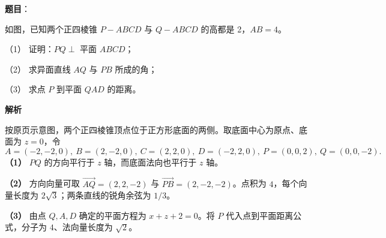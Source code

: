 \begin{answer}

\textbf{题目}：

如图，已知两个正四棱锥 $P-ABCD$ 与 $Q-ABCD$ 的高都是 2，$AB=4$。

（1） 证明：$PQ\perp$ 平面 $ABCD$；

（2） 求异面直线 $AQ$ 与 $PB$ 所成的角；

（3） 求点 $P$ 到平面 $QAD$ 的距离。
\nopagebreak[4]
\begin{center}\end{center}
\nopagebreak[4]
\textbf{解析}

按原页示意图，两个正四棱锥顶点位于正方形底面的两侧。取底面中心为原点、底面为 $z=0$，令
\nopagebreak[4]
\[
A=(-2,-2,0),\ B=(2,-2,0),\ C=(2,2,0),\ D=(-2,2,0),\ P=(0,0,2),\ Q=(0,0,-2).
\]
\textbf{（1）} $PQ$ 的方向平行于 $z$ 轴，而底面法向也平行于 $z$ 轴。

\textbf{（2）} 方向向量可取 $\overrightarrow{AQ}=(2,2,-2)$ 与 $\overrightarrow{PB}=(2,-2,-2)$。点积为 $4$，每个向量长度为 $2\sqrt3$；两条直线的锐角余弦为 $1/3$。

\textbf{（3）} 由点 $Q,A,D$ 确定的平面方程为 $x+z+2=0$。将 $P$ 代入点到平面距离公式，分子为 $4$、法向量长度为 $\sqrt2$。
\nopagebreak[4]
\begin{center}\end{center}
\nopagebreak[4]



\end{answer}

